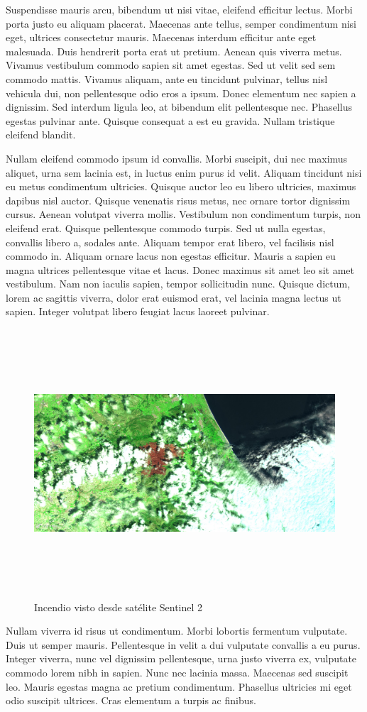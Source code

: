 \documentclass[a4paper,11pt]{article}
\begin{document}
Suspendisse mauris arcu, bibendum ut nisi vitae, eleifend efficitur lectus. Morbi porta justo eu aliquam placerat. Maecenas ante tellus, semper condimentum nisi eget, ultrices consectetur mauris. Maecenas interdum efficitur ante eget malesuada. Duis hendrerit porta erat ut pretium. Aenean quis viverra metus. Vivamus vestibulum commodo sapien sit amet egestas. Sed ut velit sed sem commodo mattis. Vivamus aliquam, ante eu tincidunt pulvinar, tellus nisl vehicula dui, non pellentesque odio eros a ipsum. Donec elementum nec sapien a dignissim. Sed interdum ligula leo, at bibendum elit pellentesque nec. Phasellus egestas pulvinar ante. Quisque consequat a est eu gravida. Nullam tristique eleifend blandit.

Nullam eleifend commodo ipsum id convallis. Morbi suscipit, dui nec maximus aliquet, urna sem lacinia est, in luctus enim purus id velit. Aliquam tincidunt nisi eu metus condimentum ultricies. Quisque auctor leo eu libero ultricies, maximus dapibus nisl auctor. Quisque venenatis risus metus, nec ornare tortor dignissim cursus. Aenean volutpat viverra mollis. Vestibulum non condimentum turpis, non eleifend erat. Quisque pellentesque commodo turpis. Sed ut nulla egestas, convallis libero a, sodales ante. Aliquam tempor erat libero, vel facilisis nisl commodo in. Aliquam ornare lacus non egestas efficitur. Mauris a sapien eu magna ultrices pellentesque vitae et lacus. Donec maximus sit amet leo sit amet vestibulum. Nam non iaculis sapien, tempor sollicitudin nunc. Quisque dictum, lorem ac sagittis viverra, dolor erat euismod erat, vel lacinia magna lectus ut sapien. Integer volutpat libero feugiat lacus laoreet pulvinar.

\begin{figure}[h]
	\centering
	\includegraphics[width=150mm,height=100mm]{figura3}
	\caption{Incendio visto desde satélite Sentinel 2}
	\label{Figura}
\end{figure}

Nullam viverra id risus ut condimentum. Morbi lobortis fermentum vulputate. Duis ut semper mauris. Pellentesque in velit a dui vulputate convallis a eu purus. Integer viverra, nunc vel dignissim pellentesque, urna justo viverra ex, vulputate commodo lorem nibh in sapien. Nunc nec lacinia massa. Maecenas sed suscipit leo. Mauris egestas magna ac pretium condimentum. Phasellus ultricies mi eget odio suscipit ultrices. Cras elementum a turpis ac finibus.
\end{document}
